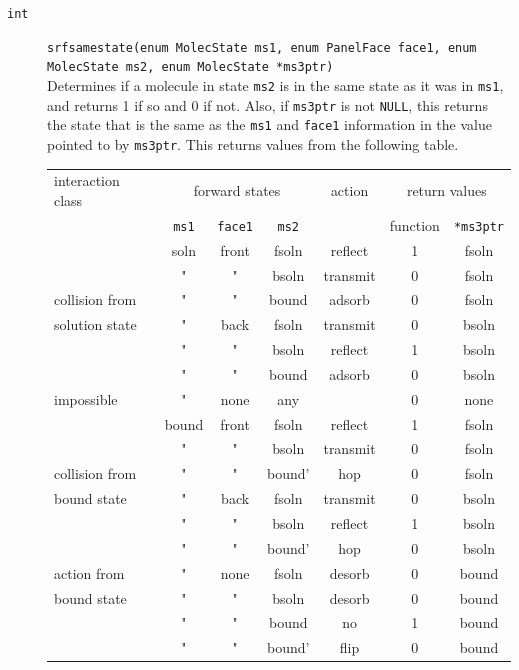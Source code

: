 \documentclass {scrbook}
\newcommand {\ttt} {\texttt}
\begin{document}
\begin{description}
\item[\ttt{int}]
\ttt{srfsamestate(enum MolecState ms1, enum PanelFace face1, enum MolecState ms2, enum MolecState *ms3ptr)}
\hfill \\
Determines if a molecule in state \ttt{ms2} is in the same state as it was in \ttt{ms1}, and returns 1 if so and 0 if not. Also, if \ttt{ms3ptr} is not \ttt{NULL}, this returns the state that is the same as the \ttt{ms1} and \ttt{face1} information in the value pointed to by \ttt{ms3ptr}. This returns values from the following table.

\begin{longtable}[c]{l|ccc|c|cc}
interaction class&\multicolumn{3}{c}{forward states}&action&\multicolumn{2}{c}{return values}\\
&\ttt{ms1}&\ttt{face1}&\ttt{ms2}& &function&\ttt{*ms3ptr}\\
\hline
&soln&front&fsoln&reflect&1&fsoln\\
&"&"&bsoln&transmit&0&fsoln\\
collision from&"&"&bound&adsorb&0&fsoln\\
solution state&"&back&fsoln&transmit&0&bsoln\\
&"&"&bsoln&reflect&1&bsoln\\
&"&"&bound&adsorb&0&bsoln\\
\hline
impossible&"&none&any& &0&none\\
\hline
&bound&front&fsoln&reflect&1&fsoln\\
&"&"&bsoln&transmit&0&fsoln\\
collision from&"&"&bound'&hop&0&fsoln\\
bound state&"&back&fsoln&transmit&0&bsoln\\
&"&"&bsoln&reflect&1&bsoln\\
&"&"&bound'&hop&0&bsoln\\
\hline
action from&"&none&fsoln&desorb&0&bound\\
bound state&"&"&bsoln&desorb&0&bound\\
&"&"&bound&no&1&bound\\
&"&"&bound'&flip&0&bound\\
\end{longtable}


\end{description}
\end{document}

